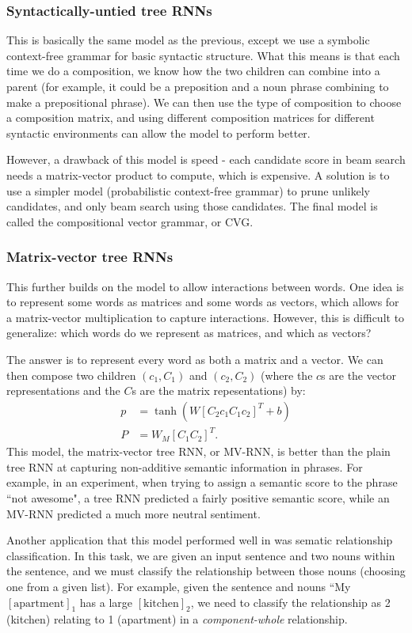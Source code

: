 \subsubsection{Syntactically-untied tree RNNs}
This is basically the same model as the previous, except we use a symbolic context-free grammar for basic syntactic structure. What this means is that each time we do a composition, we know how the two children can combine into a parent (for example, it could be a preposition and a noun phrase combining to make a prepositional phrase). We can then use the type of composition to choose a composition matrix, and using different composition matrices for different syntactic environments can allow the model to perform better.

However, a drawback of this model is speed - each candidate score in beam search needs a matrix-vector product to compute, which is expensive. A solution is to use a simpler model (probabilistic context-free grammar) to prune unlikely candidates, and only beam search using those candidates. The final model is called the compositional vector grammar, or CVG.

\subsubsection{Matrix-vector tree RNNs}
This further builds on the model to allow interactions between words. One idea is to represent some words as matrices and some words as vectors, which allows for a matrix-vector multiplication to capture interactions. However, this is difficult to generalize: which words do we represent as matrices, and which as vectors?

The answer is to represent every word as both a matrix and a vector. We can then compose two children $(c_1, C_1)$ and $(c_2, C_2)$ (where the $c$s are the vector representations and the $C$s are the matrix repesentations) by:
\begin{align*}
p &= \tanh\left(W \left[C_2c_1 C_1c_2\right]^T + b\right)\\
P &= W_M\left[C_1C_2\right]^T.
\end{align*}
This model, the matrix-vector tree RNN, or MV-RNN, is better than the plain tree RNN at capturing non-additive semantic information in phrases. For example, in an experiment, when trying to assign a semantic score to the phrase ``not awesome", a tree RNN predicted a fairly positive semantic score, while an MV-RNN predicted a much more neutral sentiment.

Another application that this model performed well in was sematic relationship classification. In this task, we are given an input sentence and two nouns within the sentence, and we must classify the relationship between those nouns (choosing one from a given list). For example, given the sentence and nouns ``My $[\text{apartment}]_1$ has a large $[\text{kitchen}]_2$, we need to classify the relationship as 2 (kitchen) relating to 1 (apartment) in a \emph{component-whole} relationship.

